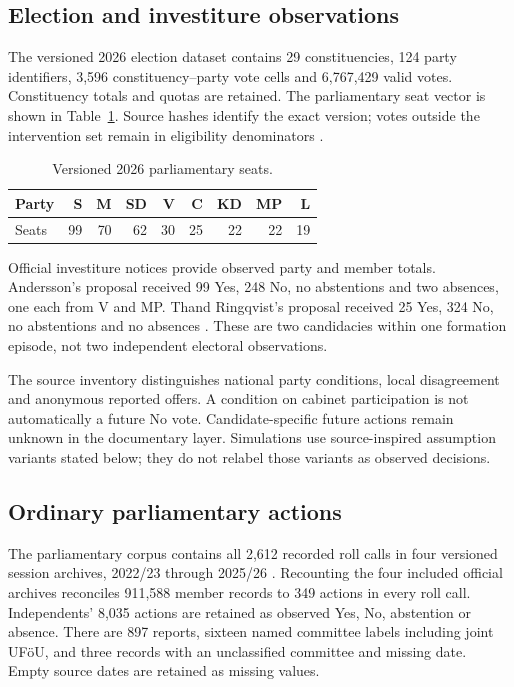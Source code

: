 \documentclass[11pt,a4paper]{article}
\begin{document}
\subsection{Election and investiture observations}

The versioned 2026 election dataset contains 29 constituencies, 124 party identifiers, 3,596 constituency--party vote cells and 6,767,429 valid votes. Constituency totals and quotas are retained. The parliamentary seat vector is shown in Table~\ref{tab:seats}. Source hashes identify the exact version; votes outside the intervention set remain in eligibility denominators \citep{val2026results}.

\begin{table}[tbp]\centering
\caption{Versioned 2026 parliamentary seats.}\label{tab:seats}
\begin{tabular}{lrrrrrrrr}\toprule
Party&S&M&SD&V&C&KD&MP&L\\\midrule
Seats&99&70&62&30&25&22&22&19\\\bottomrule
\end{tabular}
\end{table}

Official investiture notices provide observed party and member totals. Andersson's proposal received 99 Yes, 248 No, no abstentions and two absences, one each from V and MP. Thand Ringqvist's proposal received 25 Yes, 324 No, no abstentions and no absences \citep{riksdagAndersson,riksdagRingqvist}. These are two candidacies within one formation episode, not two independent electoral observations.

The source inventory distinguishes national party conditions, local disagreement and anonymous reported offers. A condition on cabinet participation is not automatically a future No vote. Candidate-specific future actions remain unknown in the documentary layer. Simulations use source-inspired assumption variants stated below; they do not relabel those variants as observed decisions.

\subsection{Ordinary parliamentary actions}

The parliamentary corpus contains all 2,612 recorded roll calls in four versioned session archives, 2022/23 through 2025/26 \citep{riksdagRollcalls}. Recounting the four included official archives reconciles 911,588 member records to 349 actions in every roll call. Independents' 8,035 actions are retained as observed Yes, No, abstention or absence. There are 897 reports, sixteen named committee labels including joint UF\"oU, and three records with an unclassified committee and missing date. Empty source dates are retained as missing values.
\end{document}
